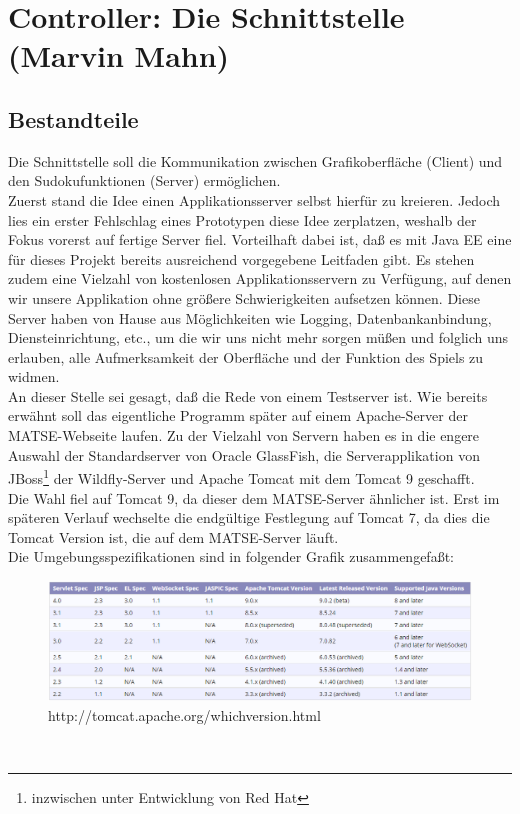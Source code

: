 \documentclass[a4paper,12pt]{scrreprt}
\begin{document}
	\section{Controller: Die Schnittstelle (Marvin Mahn)}
	\subsection{Bestandteile}
	Die Schnittstelle soll die Kommunikation zwischen Grafikoberfl\"ache (Client) und den
	Sudokufunktionen (Server) erm\"oglichen.\medskip \\
	Zuerst stand die Idee einen Applikationsserver selbst hierf\"ur zu kreieren. Jedoch lies ein
	erster Fehlschlag eines Prototypen diese Idee zerplatzen, weshalb der Fokus vorerst auf fertige
	Server fiel. Vorteilhaft dabei ist, da{\ss} es mit Java EE eine f\"ur dieses Projekt bereits
	ausreichend vorgegebene Leitfaden gibt. Es stehen zudem eine Vielzahl von kostenlosen
	Applikationsservern zu Verf\"ugung, auf denen wir unsere Applikation ohne gr\"o{\ss}ere
	Schwierigkeiten aufsetzen k\"onnen. Diese Server haben von Hause aus M\"oglichkeiten wie
	Logging, Datenbankanbindung, Diensteinrichtung, etc., um die wir uns nicht mehr sorgen
	m\"u{\ss}en und folglich uns erlauben, alle Aufmerksamkeit der Oberfl\"ache und der Funktion
	des Spiels zu widmen.\medskip \\
	An dieser Stelle sei gesagt, da{\ss} die Rede von einem Testserver ist. Wie bereits erw\"ahnt soll
	das eigentliche Programm sp\"ater auf einem Apache-Server der MATSE-Webseite laufen. Zu der
	Vielzahl von Servern haben es in die engere Auswahl der Standardserver von Oracle GlassFish,
	die Serverapplikation von JBoss\footnote{inzwischen unter Entwicklung von Red Hat} der
	Wildfly-Server und Apache Tomcat mit dem Tomcat 9 geschafft.\medskip \\
	Die Wahl fiel auf Tomcat 9, da dieser dem MATSE-Server \"ahnlicher ist. Erst im sp\"ateren Verlauf
	wechselte die endg\"ultige Festlegung auf Tomcat 7, da dies die Tomcat Version ist, die auf dem
	MATSE-Server l\"auft.\medskip \\
	Die Umgebungsspezifikationen sind in folgender Grafik zusammengefa{\ss}t:
	\begin{figure}[h]
		\includegraphics[scale=0.55]{pictures/Tomcat-Versionsvergleich}
		\caption{http://tomcat.apache.org/whichversion.html}
	\end{figure}\\
\end{document}
